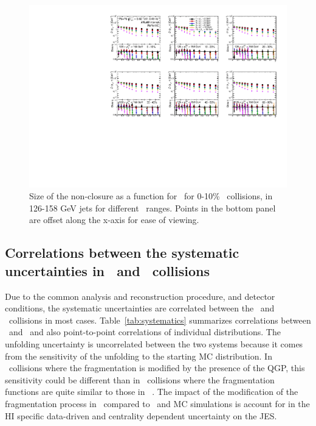 \begin{figure}
\centerline{\includegraphics[page=1,width=1.\textwidth]{figures/main/systematics/ChPS_final_dR_PbPb_MC.pdf}}
    \caption{Size of the non-closure as a function for \rvar\ for 0-10\% \pbpb\ collisions, in 126-158 GeV jets for different \pttrk\ ranges. Points in the bottom panel are offset along the x-axis for ease of viewing.}
    \label{fig:pbpbclosure}

\end{figure}
\subsection{Correlations between the systematic uncertainties in \pbpb\ and \pp\ collisions}

Due to the common analysis and reconstruction procedure, and detector conditions, the systematic uncertainties are correlated between the \pp\ and
\pbpb\ collisions in most cases. Table~\ref{tab:systematics} summarizes correlations between \pp\ and \PbPb\ and also point-to-point correlations of individual distributions. The unfolding uncertainty is uncorrelated between the two systems because it
comes from the sensitivity of the unfolding to the starting MC distribution. In \pbpb\ collisions where the fragmentation is modified by the presence of the QGP, this sensitivity could be different than in \pp\ collisions where the fragmentation functions are quite similar to those in \pythiaeight~\cite{201865}. The impact of the modification of the fragmentation process in \PbPb\ compared to \pp\ and MC simulations is account for in the HI specific data-driven and centrality dependent uncertainty on the JES.

